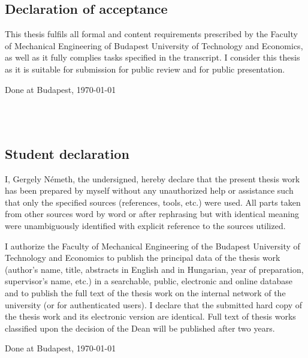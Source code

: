 \subsection*{Declaration of acceptance}

This thesis fulfils all formal and content requirements prescribed by the Faculty of Mechanical Engineering of Budapest University of Technology and Economics, as well as it fully complies tasks specified in the transcript. I consider this thesis as it is suitable for submission for public review and for public presentation.

Done at Budapest, \today

\begin{flushright}
\vspace*{1cm}
\makebox[7cm]{\rule{6cm}{.4pt}}\\
\\
\end{flushright}

\vspace*{1.5cm}

\subsection*{Student declaration}

I, Gergely Németh, the undersigned, hereby declare that the present thesis work has been prepared by myself without any unauthorized help or assistance such that only the specified sources (references, tools, etc.) were used. All parts taken from other sources word by word or after rephrasing but with identical meaning were unambiguously identified with explicit reference to the sources utilized.

I authorize the Faculty of Mechanical Engineering of the Budapest University of Technology and Economics to publish the principal data of the thesis work (author's name, title, abstracts in English and in Hungarian, year of preparation, supervisor's name, etc.) in a searchable, public, electronic and online database and to publish the full text of the thesis work on the internal network of the university (or for authenticated users). I declare that the submitted hard copy of the thesis work and its electronic version are identical. Full text of thesis works classified upon the decision of the Dean will be published after two years.

Done at Budapest, \today

\begin{flushright}
\vspace*{1cm}
\makebox[7cm]{\rule{6cm}{.4pt}}\\
\\
\end{flushright}